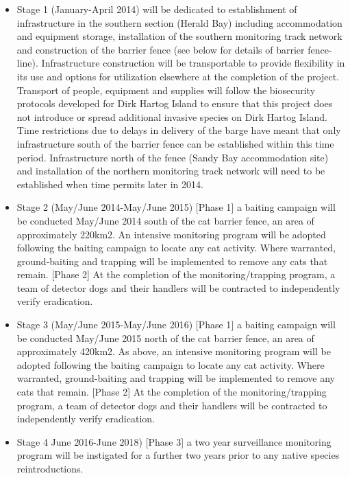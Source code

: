 \documentclass[version=last,
    paper=a4,                               %
    10pt,                                   %
    dvipsnames,
    oneside,                              %
    headings=openany,                       %
    open=any,
    BCOR=7mm,                               %
    DIV=15,     %
]{scrbook}
\begin{document}
\begin{itemize}
\item
  Stage 1 (January-April 2014) will be dedicated to establishment of
  infrastructure in the southern section (Herald Bay) including
  accommodation and equipment storage, installation of the southern
  monitoring track network and construction of the barrier fence (see
  below for details of barrier fence-line). Infrastructure construction
  will be transportable to provide flexibility in its use and options
  for utilization elsewhere at the completion of the project. Transport
  of people, equipment and supplies will follow the biosecurity
  protocols developed for Dirk Hartog Island to ensure that this project
  does not introduce or spread additional invasive species on Dirk
  Hartog Island. Time restrictions due to delays in delivery of the
  barge have meant that only infrastructure south of the barrier fence
  can be established within this time period. Infrastructure north of
  the fence (Sandy Bay accommodation site) and installation of the
  northern monitoring track network will need to be established when
  time permits later in 2014.
\item
  Stage 2 (May/June 2014-May/June 2015) {[}Phase 1{]} a baiting campaign
  will be conducted May/June 2014 south of the cat barrier fence, an
  area of approximately 220km2. An intensive monitoring program will be
  adopted following the baiting campaign to locate any cat activity.
  Where warranted, ground-baiting and trapping will be implemented to
  remove any cats that remain. {[}Phase 2{]} At the completion of the
  monitoring/trapping program, a team of detector dogs and their
  handlers will be contracted to independently verify eradication.
\item
  Stage 3 (May/June 2015-May/June 2016) {[}Phase 1{]} a baiting campaign
  will be conducted May/June 2015 north of the cat barrier fence, an
  area of approximately 420km2. As above, an intensive monitoring
  program will be adopted following the baiting campaign to locate any
  cat activity. Where warranted, ground-baiting and trapping will be
  implemented to remove any cats that remain. {[}Phase 2{]} At the
  completion of the monitoring/trapping program, a team of detector dogs
  and their handlers will be contracted to independently verify
  eradication.
\item
  Stage 4 June 2016-June 2018) {[}Phase 3{]} a two year surveillance
  monitoring program will be instigated for a further two years prior to
  any native species reintroductions.
\end{itemize}
\end{document}
